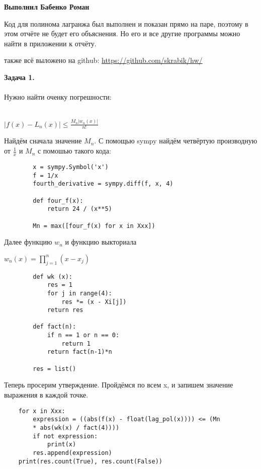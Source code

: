 \documentclass[letterpaper,12pt]{article}
\begin{document}
\begin{center}
    
    \textbf{\Huge Выполнил Бабенко Роман}

  \end{center}
  
  Код для полинома лагранжа был выполнен и показан 
  прямо на паре, поэтому в этом отчёте не будет 
  его объяснения. Но его и все другие программы 
  можно найти в приложении к отчёту.

  также всё выложено на github: \href{https://github.com/skrabik/hw/}{https://github.com/skrabik/hw/}

  \textbf{Задача 1.}
 \\~\\
  Нужно найти оченку погрешности:
    \\~\\
   \begin{center} $|f(x)-L_n(x)| \leq \frac{M_n|w_n(x)|}{n!}$
    
   \end{center}


    Найдём сначала значение $M_n$.
    С помощью sympy найдём четвёртую производную
    от $\frac{1}{x}$ и $M_n$
    с помошью такого кода: 
    \begin{lstlisting}
        x = sympy.Symbol('x')
        f = 1/x
        fourth_derivative = sympy.diff(f, x, 4)

        def four_f(x):
            return 24 / (x**5)

        Mn = max([four_f(x) for x in Xxx])
    \end{lstlisting}

    Далее функцию $w_n$ и функцию выкториала

    \begin{center}
        $w_n(x) = \prod_{j=1}^{n}(x-x_{j})$
    \end{center}

    \begin{lstlisting}
        def wk (x):
            res = 1
            for j in range(4):
                res *= (x - Xi[j])
            return res

        def fact(n):
            if n == 1 or n == 0:
                return 1
            return fact(n-1)*n

        res = list()
    \end{lstlisting}

    Теперь просерим утверждение. Пройдёмся по 
    всем x, и запишем значение выражения в 
    каждой точке.
    \begin{lstlisting}
    for x in Xxx:
        expression = ((abs(f(x) - float(lag_pol(x)))) <= (Mn 
        * abs(wk(x) / fact(4))))
        if not expression:
            print(x)
        res.append(expression)
    print(res.count(True), res.count(False))
    \end{lstlisting}
\end{document}
